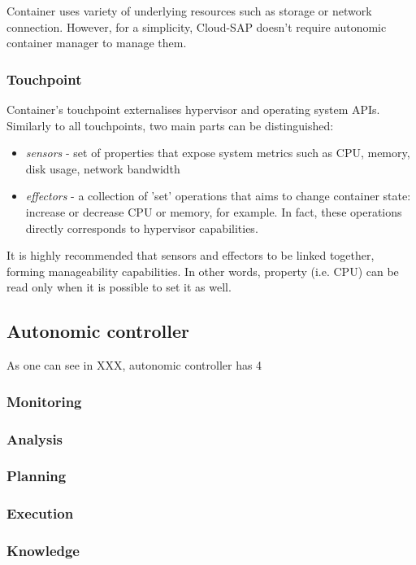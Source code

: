 Container uses variety of underlying resources such as storage or network connection. However, for a simplicity, Cloud-SAP doesn't require autonomic container manager to manage them.

\subsubsection{Touchpoint}
Container's touchpoint externalises hypervisor and operating system APIs. Similarly to all touchpoints, two main parts can be distinguished:
\begin{itemize}
 \item \emph{sensors} - set of properties that expose system metrics such as CPU, memory, disk usage, network bandwidth
 \item \emph{effectors} - a collection of 'set' operations that aims to change container state: increase or decrease CPU or memory, for example. In fact, these operations directly corresponds to hypervisor capabilities.
\end{itemize}

It is highly recommended that sensors and effectors to be linked together, forming manageability capabilities. In other words, property (i.e. CPU) can be read only when it is possible to set it as well.

\subsection{Autonomic controller}
As one can see in XXX, autonomic controller has 4

\subsubsection{Monitoring}

\subsubsection{Analysis}
\subsubsection{Planning}
\subsubsection{Execution}
\subsubsection{Knowledge}

